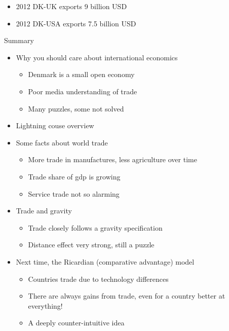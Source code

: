 \documentclass[ignorenonframetext,]{beamer}
\begin{document}
\begin{frame}

    \begin{itemize}
        \item 2012 DK-UK exports 9 billion USD
        \item 2012 DK-USA exports 7.5 billion USD
    \end{itemize}

\end{frame}

\begin{frame}{Summary}

  \begin{itemize}
  \itemsep1pt\parskip0pt
  \item Why you should care about international economics
        \begin{itemize}
            \item Denmark is a small open economy
            \item Poor media understanding of trade 
            \item Many puzzles, some not solved 
        \end{itemize}
  \item Lightning couse overview
  \item Some facts about world trade
        \begin{itemize}
            \item More trade in manufactures, less agriculture over time 
            \item Trade share of gdp is growing 
            \item Service trade not so alarming 
        \end{itemize}
  \item Trade and gravity
        \begin{itemize}
            \item Trade closely follows a gravity specification
            \item Distance effect very strong, still a puzzle
        \end{itemize}
  \end{itemize}

\end{frame}

\begin{frame}

    \begin{itemize}
        \item Next time, the Ricardian (comparative advantage) model
        \begin{itemize}
            \item Countries trade due to technology differences
            \item There are always gains from trade, even for a country better at everything!
            \item A deeply counter-intuitive idea
        \end{itemize}
    \end{itemize}

\end{frame}
\end{document}
